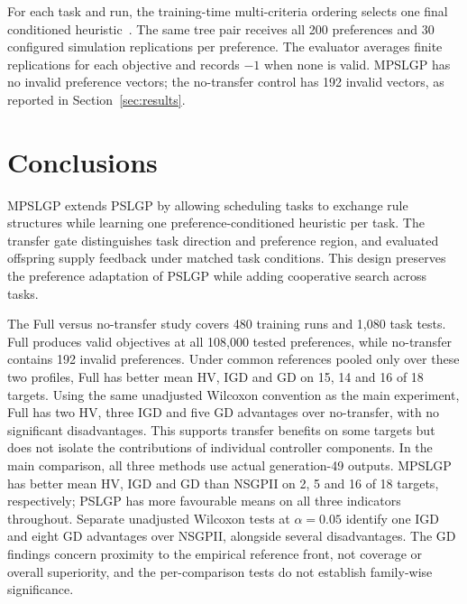 \documentclass[10pt,journal]{IEEEtran}
\newcommand{\resultrevision}[1]{\textcolor{resultrevision}{#1}}
\begin{document}
\resultrevision{For each task and run, the training-time multi-criteria ordering selects one final conditioned heuristic~\cite{xu2026pslgp}. The same tree pair receives all 200 preferences and 30 configured simulation replications per preference. The evaluator averages finite replications for each objective and records $-1$ when none is valid. MPSLGP has no invalid preference vectors; the no-transfer control has 192 invalid vectors, as reported in Section~\ref{sec:results}.}


\FloatBarrier

\FloatBarrier



\section{Conclusions}
\label{sec:conclusions}
\resultrevision{MPSLGP extends PSLGP by allowing scheduling tasks to exchange rule structures while learning one preference-conditioned heuristic per task. The transfer gate distinguishes task direction and preference region, and evaluated offspring supply feedback under matched task conditions. This design preserves the preference adaptation of PSLGP while adding cooperative search across tasks.}

\resultrevision{The Full versus no-transfer study covers 480 training runs and 1,080 task tests. Full produces valid objectives at all 108,000 tested preferences, while no-transfer contains 192 invalid preferences. Under common references pooled only over these two profiles, Full has better mean HV, IGD and GD on 15, 14 and 16 of 18 targets. Using the same unadjusted Wilcoxon convention as the main experiment, Full has two HV, three IGD and five GD advantages over no-transfer, with no significant disadvantages. This supports transfer benefits on some targets but does not isolate the contributions of individual controller components. In the main comparison, all three methods use actual generation-49 outputs. MPSLGP has better mean HV, IGD and GD than NSGPII on 2, 5 and 16 of 18 targets, respectively; PSLGP has more favourable means on all three indicators throughout. Separate unadjusted Wilcoxon tests at $\alpha=0.05$ identify one IGD and eight GD advantages over NSGPII, alongside several disadvantages. The GD findings concern proximity to the empirical reference front, not coverage or overall superiority, and the per-comparison tests do not establish family-wise significance.}
\end{document}
